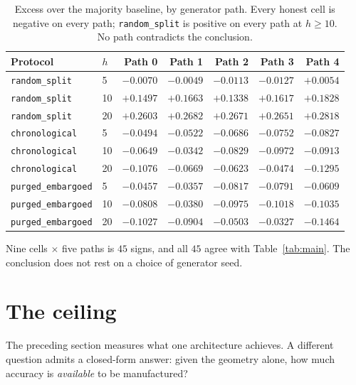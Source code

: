 \documentclass[11pt,a4paper]{article}
\begin{document}
\begin{table}[h]
\centering
\small
\begin{tabular}{llrrrrr}
\toprule
Protocol & $h$ & Path 0 & Path 1 & Path 2 & Path 3 & Path 4 \\
\midrule
\texttt{random\_split} & 5 & $-0.0070$ & $-0.0049$ & $-0.0113$ & $-0.0127$ & $+0.0054$ \\
\texttt{random\_split} & 10 & $+0.1497$ & $+0.1663$ & $+0.1338$ & $+0.1617$ & $+0.1828$ \\
\texttt{random\_split} & 20 & $+0.2603$ & $+0.2682$ & $+0.2671$ & $+0.2651$ & $+0.2818$ \\
\texttt{chronological} & 5 & $-0.0494$ & $-0.0522$ & $-0.0686$ & $-0.0752$ & $-0.0827$ \\
\texttt{chronological} & 10 & $-0.0649$ & $-0.0342$ & $-0.0829$ & $-0.0972$ & $-0.0913$ \\
\texttt{chronological} & 20 & $-0.1076$ & $-0.0669$ & $-0.0623$ & $-0.0474$ & $-0.1295$ \\
\texttt{purged\_embargoed} & 5 & $-0.0457$ & $-0.0357$ & $-0.0817$ & $-0.0791$ & $-0.0609$ \\
\texttt{purged\_embargoed} & 10 & $-0.0808$ & $-0.0380$ & $-0.0975$ & $-0.1018$ & $-0.1035$ \\
\texttt{purged\_embargoed} & 20 & $-0.1027$ & $-0.0904$ & $-0.0503$ & $-0.0327$ & $-0.1464$ \\
\bottomrule
\end{tabular}
\caption{Excess over the majority baseline, by generator path. Every honest cell
is negative on every path; \texttt{random\_split} is positive on every path at
$h \geq 10$. No path contradicts the conclusion.}
\end{table}

Nine cells $\times$ five paths is $45$ signs, and all $45$ agree with
Table~\ref{tab:main}. The conclusion does not rest on a choice of generator
seed.

\section{The ceiling}
\label{sec:ceiling}

The preceding section measures what one architecture achieves. A different
question admits a closed-form answer: given the geometry alone, how much
accuracy is \emph{available} to be manufactured?
\end{document}
